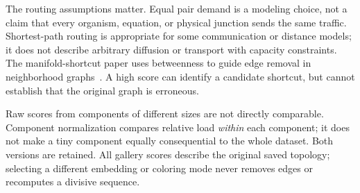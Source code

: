 \documentclass[11pt]{article}
\begin{document}
The routing assumptions matter. Equal pair demand is a modeling choice, not a claim that every organism, equation, or physical junction sends the same traffic. Shortest-path routing is appropriate for some communication or distance models; it does not describe arbitrary diffusion or transport with capacity constraints. The manifold-shortcut paper uses betweenness to guide edge removal in neighborhood graphs~\cite{cukierski}. A high score can identify a candidate shortcut, but cannot establish that the original graph is erroneous.

Raw scores from components of different sizes are not directly comparable. Component normalization compares relative load \emph{within} each component; it does not make a tiny component equally consequential to the whole dataset. Both versions are retained. All gallery scores describe the original saved topology; selecting a different embedding or coloring mode never removes edges or recomputes a divisive sequence.

\clearpage
\end{document}
